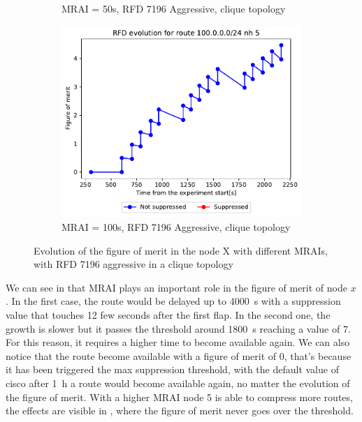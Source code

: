 \begin{figure}[h]
\begin{subfigure}[b]{0.3\textwidth}
         \caption{MRAI = 50s, RFD 7196 Aggressive, clique topology}
         \label{fig:clique_x_mrai50_rfd7196Aggressive}
     \end{subfigure}
     \hfill
     \begin{subfigure}[b]{0.3\textwidth}
         \centering
         \includegraphics[width=\textwidth]{images/RFD/clique/FigureOfMerit/mrai21_RFD_7196_aggressive_x_rfd_R1.pdf}
         \caption{MRAI = 100s, RFD 7196 Aggressive, clique topology}
         \label{fig:clique_x_mrai100_rfd7196Aggressive}
     \end{subfigure}
        \caption{Evolution of the figure of merit in the node X with different MRAIs, with RFD 7196 aggressive in a clique topology}
        \label{fig:clique_nodex_rfd7196Aggressive}
\end{figure}

We can see in 
that \ac{MRAI} plays an important role in the figure of merit of node $x$.
In the first case, the route would be delayed up to \SI{4000}{\second} with a
suppression value that touches \num{12} few seconds after the first flap.
In the second one, the growth is slower but it passes the threshold around
\SI{1800}{\second} reaching a value of \num{7}.
For this reason, it requires a higher time to become available again.
We can also notice that the route become available with a figure of merit of
\num{0}, that's because it has been triggered the max suppression threshold,
with the default value of cisco after \SI{1}{\hour} a route would become available
again, no matter the evolution of the figure of merit.
With a higher \ac{MRAI} node \num{5} is able to compress more routes, the effects
are visible in , where the figure of
merit never goes over the threshold.

